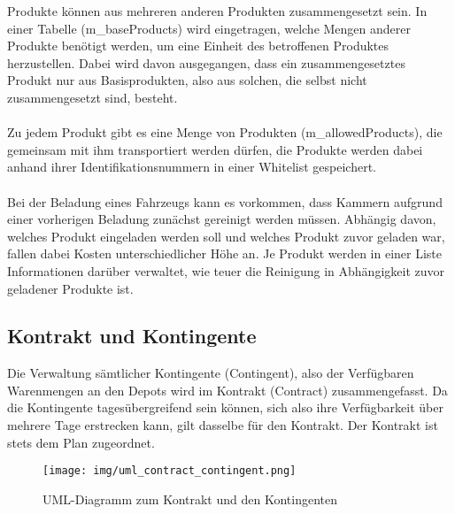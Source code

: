 \vspace*{-1em}
\noindent
Produkte können aus mehreren anderen Produkten zusammengesetzt sein. In einer Tabelle (\textsf{m\_baseProducts}) wird eingetragen, welche Mengen anderer Produkte benötigt werden, um eine Einheit des betroffenen Produktes herzustellen. Dabei wird davon ausgegangen, dass ein zusammengesetztes Produkt nur aus Basisprodukten, also aus solchen, die selbst nicht zusammengesetzt sind, besteht. \\
\\
Zu jedem Produkt gibt es eine Menge von Produkten (\textsf{m\_allowedProducts}), die gemeinsam mit ihm transportiert werden dürfen, die Produkte werden dabei anhand ihrer Identifikationsnummern in einer Whitelist gespeichert. \\
\\
Bei der Beladung eines Fahrzeugs kann es vorkommen, dass Kammern aufgrund einer vorherigen Beladung zunächst gereinigt werden müssen. Abhängig davon, welches Produkt eingeladen werden soll und welches Produkt zuvor geladen war, fallen dabei Kosten unterschiedlicher Höhe an. Je Produkt werden in einer Liste Informationen darüber verwaltet, wie teuer die Reinigung in Abhängigkeit zuvor geladener Produkte ist.


\subsection{Kontrakt und Kontingente}\label{chp:contract}
Die Verwaltung sämtlicher Kontingente (\textsf{Contingent}), also der Verfügbaren Warenmengen an den Depots wird im Kontrakt (\textsf{Contract}) zusammengefasst. Da die Kontingente tagesübergreifend sein können, sich also ihre Verfügbarkeit über mehrere Tage erstrecken kann, gilt dasselbe für den Kontrakt. Der Kontrakt ist stets dem Plan zugeordnet.

\begin{figure}[h]
  \centering
  \texttt{[image: img/uml\_contract\_contingent.png]}
  \caption{UML-Diagramm zum Kontrakt und den Kontingenten}
  \label{fig:uml_contract_contingent}
\end{figure}

